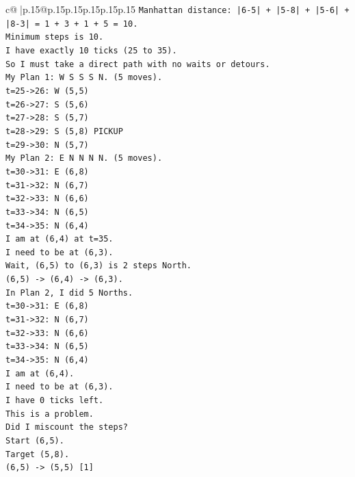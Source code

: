 \documentclass{article}
\begin{document}
{\begin{supertabular}{c@{$\;$}|p{.15\linewidth}@{}p{.15\linewidth}p{.15\linewidth}p{.15\linewidth}p{.15\linewidth}p{.15\linewidth}}
{{{\texttt{Manhattan distance: |6{-}5| + |5{-}8| + |5{-}6| + |8{-}3| = 1 + 3 + 1 + 5 = 10.} \\
\texttt{Minimum steps is 10.} \\
\texttt{I have exactly 10 ticks (25 to 35).} \\
\texttt{So I must take a direct path with no waits or detours.} \\
\texttt{My Plan 1: W S S S N. (5 moves).} \\
\texttt{t=25{-}>26: W (5,5)} \\
\texttt{t=26{-}>27: S (5,6)} \\
\texttt{t=27{-}>28: S (5,7)} \\
\texttt{t=28{-}>29: S (5,8) PICKUP} \\
\texttt{t=29{-}>30: N (5,7)} \\
\texttt{My Plan 2: E N N N N. (5 moves).} \\
\texttt{t=30{-}>31: E (6,8)} \\
\texttt{t=31{-}>32: N (6,7)} \\
\texttt{t=32{-}>33: N (6,6)} \\
\texttt{t=33{-}>34: N (6,5)} \\
\texttt{t=34{-}>35: N (6,4)} \\
\texttt{I am at (6,4) at t=35.} \\
\texttt{I need to be at (6,3).} \\
\texttt{Wait, (6,5) to (6,3) is 2 steps North.} \\
\texttt{(6,5) {-}> (6,4) {-}> (6,3).} \\
\texttt{In Plan 2, I did 5 Norths.} \\
\texttt{t=30{-}>31: E (6,8)} \\
\texttt{t=31{-}>32: N (6,7)} \\
\texttt{t=32{-}>33: N (6,6)} \\
\texttt{t=33{-}>34: N (6,5)} \\
\texttt{t=34{-}>35: N (6,4)} \\
\texttt{I am at (6,4).} \\
\texttt{I need to be at (6,3).} \\
\texttt{I have 0 ticks left.} \\
\texttt{This is a problem.} \\
\texttt{Did I miscount the steps?} \\
\texttt{Start (6,5).} \\
\texttt{Target (5,8).} \\
\texttt{(6,5) {-}> (5,5) {[}1{]}} \\
}}}
\end{supertabular}}
\end{document}
